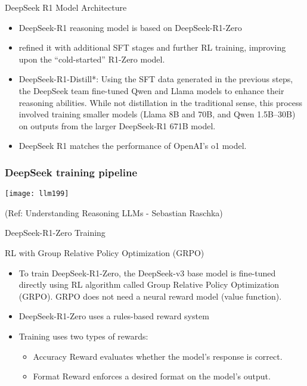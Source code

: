 \begin{frame}[fragile]{DeepSeek R1 Model Architecture}


    \begin{itemize}
        \item  DeepSeek-R1 reasoning model is based on  DeepSeek-R1-Zero
		\item refined it with additional SFT stages and further RL training, improving upon the “cold-started” R1-Zero model.
		\item DeepSeek-R1-Distill*: Using the SFT data generated in the previous steps, the DeepSeek team fine-tuned Qwen and Llama models to enhance their reasoning abilities. While not distillation in the traditional sense, this process involved training smaller models (Llama 8B and 70B, and Qwen 1.5B–30B) on outputs from the larger DeepSeek-R1 671B model.
		\item DeepSeek R1 matches the performance of OpenAI's o1 model. 
    \end{itemize}
\end{frame}


\begin{frame}[fragile]\frametitle{DeepSeek training pipeline}

		\begin{center}
		\texttt{[image: llm199]}
		
		{\tiny (Ref: Understanding Reasoning LLMs - Sebastian Raschka)}
	
		\end{center}

 
\end{frame}


\begin{frame}[fragile]{DeepSeek-R1-Zero Training}

RL with Group Relative Policy Optimization (GRPO)

    \begin{itemize}
        \item  To train DeepSeek-R1-Zero, the DeepSeek-v3 base model is fine-tuned 
directly using RL algorithm called Group Relative Policy Optimization 
(GRPO). GRPO does not need a neural reward model (value function).
        \item   DeepSeek-R1-Zero uses a rules-based reward system 
		\item Training uses two types of rewards:
		    \begin{itemize}
				\item   Accuracy Reward evaluates whether the model's response is correct.
				\item   Format Reward  enforces a desired format on the model's output.  
		    \end{itemize}

    \end{itemize}
\end{frame}



